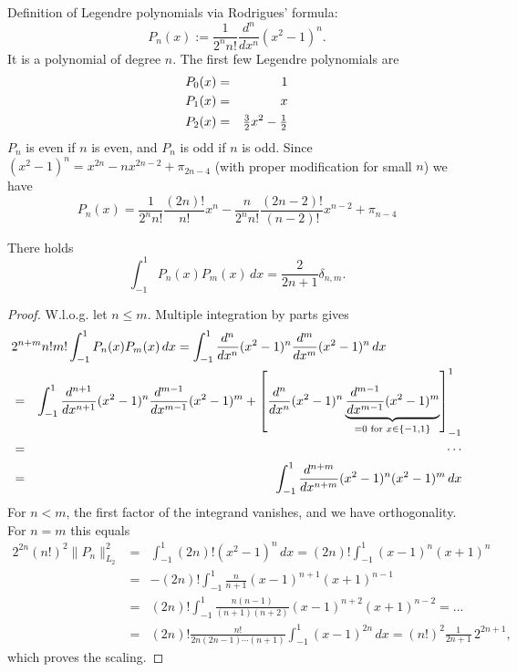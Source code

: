 Definition of Legendre polynomials via Rodrigues' formula:
$$
P_n(x) := \frac{1}{2^n n!} \frac{d^n}{dx^n} (x^2-1)^n.
$$
It is a polynomial of degree $n$. The first few Legendre polynomials are
\begin{eqnarray*}
P_0(x) & = & 1 \\
P_1(x) & = & x \\
P_2(x) & = & { \textstyle \frac{3}{2} } x^2 - { \textstyle \frac{1}{2} }
\end{eqnarray*}
$P_n$ is even if $n$ is even, and $P_n$ is odd if $n$ is odd.
Since $(x^2-1)^n = x^{2n} - n x^{2n-2} + \pi_{2n-4}$ (with proper
modification for small $n$) we have
\begin{equation}
\label{equ_leadingcoef}
P_n(x) = \frac{1}{2^n n!} \frac{ (2n)! }{ n! } x^n - \frac{n}{2^n n!} \frac{ (2n-2)!} {(n-2)!} x^{n-2} + \pi_{n-4}
\end{equation}
\begin{lemma} \label{lemma_ortho} There holds
\begin{equation} \label{equ_ortho}
\int_{-1}^1 P_n(x) P_m(x) \, dx = \frac{2}{2n+1} \delta_{n,m}.
\end{equation}
\end{lemma}
\begin{proof} W.l.o.g. let $n \leq m$. Multiple integration by parts gives
\begin{eqnarray*}
\lefteqn{ 2^{n+m} n! m! \int_{-1}^1 P_n(x) P_m(x) \, dx = 
\int_{-1}^1 \frac{d^n}{dx^n} (x^2-1)^n \frac{d^m}{dx^m} (x^2-1)^n  \, dx}
\\
& = & \int_{-1}^1 \frac{d^{n+1}}{dx^{n+1}} (x^2-1)^n \frac{d^{m-1}}{dx^{m-1}} (x^2-1)^m 
+ 
\left[ \frac{d^n}{dx^{n}} (x^2-1)^n \underbrace{ \frac{d^{m-1}}{dx^{m-1}} (x^2-1)^m}_{= 0 \text{ for } x \in \{ -1, 1\}} \right]_{-1}^1 \\
& = & \cdots \\
& = & \int_{-1}^1 \frac{d^{n+m}}{dx^{n+m}} (x^2-1)^n (x^2-1)^m \, dx
\end{eqnarray*} 
For $n < m$, the first factor of the integrand vanishes, and we have orthogonality. For $n = m$ this equals
\begin{eqnarray*}
2^{2n} (n!)^2 \| P_n \|_{L_2}^2 &= &\int_{-1}^1 (2n)! (x^2-1)^n \, dx = (2n)! \int_{-1}^1 (x-1)^n (x+1)^n \\
& = & -(2n)! \int_{-1}^1 \frac{n}{n+1} (x-1)^{n+1} (x+1)^{n-1} \\
& = & (2n)! \int_{-1}^1 \frac{ n (n-1) }{ (n+1) (n+2) } (x-1)^{n+2}(x+1)^{n-2} = ...  \\
& = & (2n)! \frac{n!} {2n (2n-1) \cdots (n+1)} \int_{-1}^1 (x-1)^{2 n} \, dx = (n!)^2 \frac{1}{2n+1} \, 2^{2n+1},
\end{eqnarray*}
which proves the scaling.
\end{proof}

